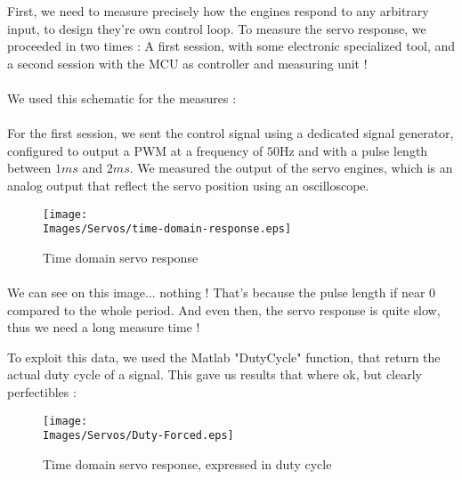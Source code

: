 First, we need to measure precisely how the engines respond to any arbitrary input, to design they're own control loop.
To measure the servo response, we proceeded in two times : A first session, with some electronic specialized tool,
and a second session with the MCU as controller and measuring unit !

\paragraph{}
We used this schematic for the measures :


\paragraph{}
For the first session, we sent the control signal using a dedicated signal generator, configured
to output a PWM at a frequency of $50 \si{\hertz}$ and with a pulse length between $1 \si{ms}$ and
$2 \si{ms}$.
We measured the output of the servo engines, which is an analog output that reflect the servo position
using an oscilloscope.

\begin{figure}[!hbt]
    \centering
    \texttt{[image: \\Images/Servos/time-domain-response.eps]}
    \caption{Time domain servo response}
\end{figure}
\FloatBarrier

\paragraph{}
We can see on this image... nothing ! That's because the pulse length if near 0 compared to the whole
period. And even then, the servo response is quite slow, thus we need a long measure time !

To exploit this data, we used the Matlab "DutyCycle" function, that return the actual duty cycle of a signal.
This gave us results that where ok, but clearly perfectibles :

\begin{figure}[!hbt]
    \centering
    \texttt{[image: \\Images/Servos/Duty-Forced.eps]}
    \caption{Time domain servo response, expressed in duty cycle}
\end{figure}
\FloatBarrier

